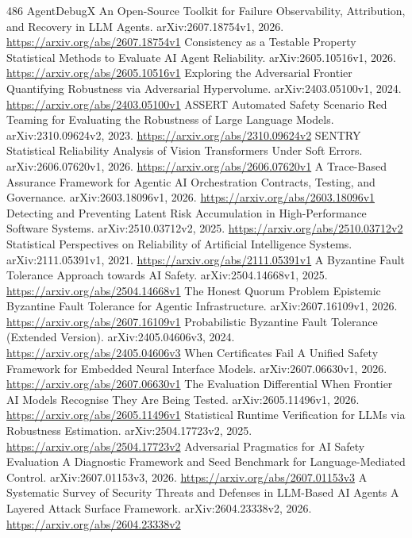 \documentclass[11pt]{article}
\begin{document}
\begin{thebibliography}{486}
 AgentDebugX An Open-Source Toolkit for Failure Observability, Attribution, and Recovery in LLM Agents. arXiv:2607.18754v1, 2026. \url{https://arxiv.org/abs/2607.18754v1}
 Consistency as a Testable Property Statistical Methods to Evaluate AI Agent Reliability. arXiv:2605.10516v1, 2026. \url{https://arxiv.org/abs/2605.10516v1}
 Exploring the Adversarial Frontier Quantifying Robustness via Adversarial Hypervolume. arXiv:2403.05100v1, 2024. \url{https://arxiv.org/abs/2403.05100v1}
 ASSERT Automated Safety Scenario Red Teaming for Evaluating the Robustness of Large Language Models. arXiv:2310.09624v2, 2023. \url{https://arxiv.org/abs/2310.09624v2}
 SENTRY Statistical Reliability Analysis of Vision Transformers Under Soft Errors. arXiv:2606.07620v1, 2026. \url{https://arxiv.org/abs/2606.07620v1}
 A Trace-Based Assurance Framework for Agentic AI Orchestration Contracts, Testing, and Governance. arXiv:2603.18096v1, 2026. \url{https://arxiv.org/abs/2603.18096v1}
 Detecting and Preventing Latent Risk Accumulation in High-Performance Software Systems. arXiv:2510.03712v2, 2025. \url{https://arxiv.org/abs/2510.03712v2}
 Statistical Perspectives on Reliability of Artificial Intelligence Systems. arXiv:2111.05391v1, 2021. \url{https://arxiv.org/abs/2111.05391v1}
 A Byzantine Fault Tolerance Approach towards AI Safety. arXiv:2504.14668v1, 2025. \url{https://arxiv.org/abs/2504.14668v1}
 The Honest Quorum Problem Epistemic Byzantine Fault Tolerance for Agentic Infrastructure. arXiv:2607.16109v1, 2026. \url{https://arxiv.org/abs/2607.16109v1}
 Probabilistic Byzantine Fault Tolerance (Extended Version). arXiv:2405.04606v3, 2024. \url{https://arxiv.org/abs/2405.04606v3}
 When Certificates Fail A Unified Safety Framework for Embedded Neural Interface Models. arXiv:2607.06630v1, 2026. \url{https://arxiv.org/abs/2607.06630v1}
 The Evaluation Differential When Frontier AI Models Recognise They Are Being Tested. arXiv:2605.11496v1, 2026. \url{https://arxiv.org/abs/2605.11496v1}
 Statistical Runtime Verification for LLMs via Robustness Estimation. arXiv:2504.17723v2, 2025. \url{https://arxiv.org/abs/2504.17723v2}
 Adversarial Pragmatics for AI Safety Evaluation A Diagnostic Framework and Seed Benchmark for Language-Mediated Control. arXiv:2607.01153v3, 2026. \url{https://arxiv.org/abs/2607.01153v3}
 A Systematic Survey of Security Threats and Defenses in LLM-Based AI Agents A Layered Attack Surface Framework. arXiv:2604.23338v2, 2026. \url{https://arxiv.org/abs/2604.23338v2}

\end{thebibliography}
\end{document}
